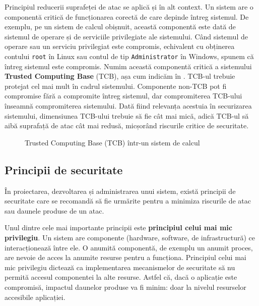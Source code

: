 Principiul reducerii suprafeței de atac se aplică și în alt context.
Un sistem are o componentă critică de funcționarea corectă de care depinde întreg sistemul.
De exemplu, pe un sistem de calcul obișnuit, această componentă este dată de sistemul de operare și de serviciile privilegiate ale sistemului.
Când sistemul de operare sau un serviciu privilegiat este compromis, echivalent cu obținerea contului \texttt{root} în Linux sau contul de tip \texttt{Administrator} în Windows, spunem că întreg sistemul este compromis.
Numim această componentă critică a sistemului \textbf{Trusted Computing Base} (TCB), așa cum indicăm în .
TCB-ul trebuie protejat cel mai mult în cadrul sistemului.
Componente non-TCB pot fi compromise fără a compromite întreg sistemul, dar compromiterea TCB-ului înseamnă compromiterea sistemului.
Dată fiind relevanța acestuia în securizarea sistemului, dimensiunea TCB-ului trebuie să fie cât mai mică, adică TCB-ul să aibă suprafață de atac cât mai redusă, micșorând riscurile critice de securitate.

\begin{figure}[htbp]
  \centering
  \def\svgwidth{\columnwidth}
  
  \caption{Trusted Computing Base (TCB) într-un sistem de calcul}
  \label{fig:sec:tcb}
\end{figure}

\subsection{Principii de securitate}
\label{sec:sec:fundamentals:principles}

În proiectarea, dezvoltarea și administrarea unui sistem, există principii de securitate care se recomandă să fie urmărite pentru a minimiza riscurile de atac sau daunele produse de un atac.

Unul dintre cele mai importante principii este \textbf{principiul celui mai mic privilegiu}.
Un sistem are componente (hardware, software, de infrastructură) ce interacționează între ele.
O anumită componentă, de exemplu un anumit proces, are nevoie de acces la anumite resurse pentru a funcționa.
Principiul celui mai mic privilegiu dictează ca implementarea mecanismelor de securitate să nu permită accesul componentei la alte resurse.
Astfel că, dacă o aplicație este compromisă, impactul daunelor produse va fi minim: doar la nivelul resurselor accesibile aplicației.

